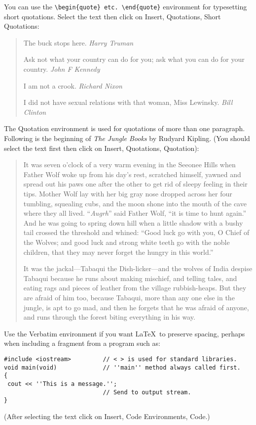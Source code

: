 \documentclass{article}%
\begin{document}
You can use the \verb"\begin{quote} etc. \end{quote}" environment for typesetting
short quotations. Select the text then click on Insert, Quotations, Short Quotations:

\begin{quote}
The buck stops here. \emph{Harry Truman}

Ask not what your country can do for you; ask what you can do for your
country. \emph{John F Kennedy}

I am not a crook. \emph{Richard Nixon}

I did not have sexual relations with that woman, Miss Lewinsky. \emph{Bill Clinton}
\end{quote}

The Quotation environment is used for quotations of more than one paragraph. Following
is the beginning of \emph{The Jungle Books} by Rudyard Kipling. (You should select
the text first then click on Insert, Quotations, Quotation):

\begin{quotation}
It was seven o'clock of a very warm evening in the Seeonee Hills when Father Wolf woke
up from his day's rest, scratched himself, yawned  and spread out his paws one after
the other to get rid of sleepy feeling in their tips. Mother Wolf lay with her big gray
nose dropped across her four tumbling, squealing cubs, and the moon shone into the
mouth of the cave where they all lived. ``\emph{Augrh}'' said Father Wolf, ``it is time
to hunt again.'' And he was going to spring down hill when a little shadow with a bushy
tail crossed the threshold and whined: ``Good luck go with you, O Chief of the Wolves;
and good luck and strong white teeth go with the noble children, that they may never
forget the hungry in this world.''

It was the jackal---Tabaqui the Dish-licker---and the wolves of India despise Tabaqui
because he runs about making mischief, and telling tales, and eating rags and pieces of
leather from the village rubbish-heaps. But they are afraid of him too, because
Tabaqui, more than any one else in the jungle, is apt to go mad, and then he forgets
that he was afraid of anyone, and runs through the forest biting everything in his way.
\end{quotation}

Use the Verbatim environment if you want \LaTeX\ to preserve spacing, perhaps when
including a fragment from a program such as:
\begin{verbatim}
#include <iostream>         // < > is used for standard libraries.
void main(void)             // ''main'' method always called first.
{
 cout << ''This is a message.'';
                            // Send to output stream.
}
\end{verbatim}
(After selecting the text click on Insert, Code Environments, Code.)
\end{document}
